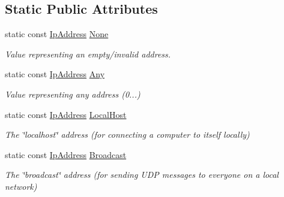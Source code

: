 \subsection*{Static Public Attributes}
\begin{DoxyCompactItemize}
\item 
\mbox{\label{classsf_1_1_ip_address_a4619b4abbe3c8fef056e7299db967404}} 
static const \mbox{\hyperlink{classsf_1_1_ip_address}{Ip\+Address}} \mbox{\hyperlink{classsf_1_1_ip_address_a4619b4abbe3c8fef056e7299db967404}{None}}
\begin{DoxyCompactList}\small\item\em Value representing an empty/invalid address. \end{DoxyCompactList}\item 
\mbox{\label{classsf_1_1_ip_address_a3dbc10b0dc6804cc69e29342f7406907}} 
static const \mbox{\hyperlink{classsf_1_1_ip_address}{Ip\+Address}} \mbox{\hyperlink{classsf_1_1_ip_address_a3dbc10b0dc6804cc69e29342f7406907}{Any}}
\begin{DoxyCompactList}\small\item\em Value representing any address (0...) \end{DoxyCompactList}\item 
\mbox{\label{classsf_1_1_ip_address_a594d3a8e2559f8fa8ab0a96fa597333b}} 
static const \mbox{\hyperlink{classsf_1_1_ip_address}{Ip\+Address}} \mbox{\hyperlink{classsf_1_1_ip_address_a594d3a8e2559f8fa8ab0a96fa597333b}{Local\+Host}}
\begin{DoxyCompactList}\small\item\em The \char`\"{}localhost\char`\"{} address (for connecting a computer to itself locally) \end{DoxyCompactList}\item 
\mbox{\label{classsf_1_1_ip_address_aa93d1d57b65d243f2baf804b6035465c}} 
static const \mbox{\hyperlink{classsf_1_1_ip_address}{Ip\+Address}} \mbox{\hyperlink{classsf_1_1_ip_address_aa93d1d57b65d243f2baf804b6035465c}{Broadcast}}
\begin{DoxyCompactList}\small\item\em The \char`\"{}broadcast\char`\"{} address (for sending U\+DP messages to everyone on a local network) \end{DoxyCompactList}\end{DoxyCompactItemize}
